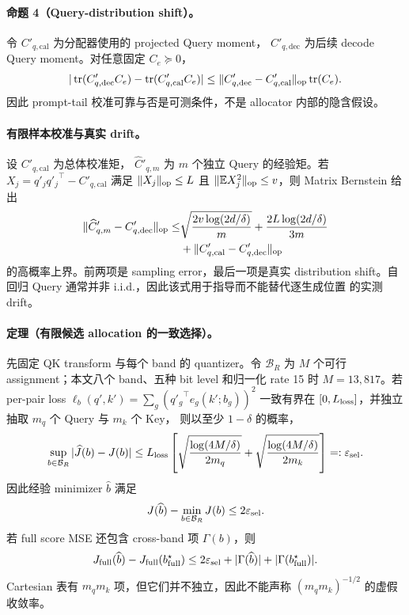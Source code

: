 \paragraph{命题 4（Query-distribution shift）。}
令 $C'_{q,\mathrm{cal}}$ 为分配器使用的 projected Query moment，
$C'_{q,\mathrm{dec}}$ 为后续 decode Query moment。对任意固定
$C_e\succeq0$，
\begin{equation}
 |\operatorname{tr}(C'_{q,\mathrm{dec}}C_e)
 -\operatorname{tr}(C'_{q,\mathrm{cal}}C_e)|
 \le
 \|C'_{q,\mathrm{dec}}-C'_{q,\mathrm{cal}}\|_{\mathrm{op}}\operatorname{tr}(C_e).
 \label{eq:query-drift-bound}
\end{equation}
因此 prompt-tail 校准可靠与否是可测条件，不是 allocator 内部的隐含假设。

\paragraph{有限样本校准与真实 drift。}
设 $C'_{q,\mathrm{cal}}$ 为总体校准矩，
$\widehat C'_{q,m}$ 为 $m$ 个独立 Query 的经验矩。若
$X_j=q'_j{q'_j}^\top-C'_{q,\mathrm{cal}}$ 满足
$\|X_j\|_{\mathrm{op}}\le L$ 且
$\|\mathbb EX_j^2\|_{\mathrm{op}}\le v$，则 Matrix Bernstein 给出
\begin{align}
 \|\widehat C'_{q,m}-C'_{q,\mathrm{dec}}\|_{\mathrm{op}}
 \le&
 \sqrt{\frac{2v\log(2d/\delta)}{m}}
 +\frac{2L\log(2d/\delta)}{3m}\nonumber\\
 &+\|C'_{q,\mathrm{cal}}-C'_{q,\mathrm{dec}}\|_{\mathrm{op}}
 \label{eq:finite-query-bound}
\end{align}
的高概率上界。前两项是 sampling error，最后一项是真实 distribution
shift。自回归 Query 通常并非 i.i.d.，因此该式用于指导而不能替代逐生成位置
的实测 drift。

\paragraph{定理（有限候选 allocation 的一致选择）。}
先固定 QK transform 与每个 band 的 quantizer。令 $\mathcal B_R$ 为
$M$ 个可行 assignment；本文八个 band、五种 bit level 和归一化 rate 15
时 $M=13{,}817$。若 per-pair loss
$\ell_b(q',k')=\sum_g({q'_g}^\top e_g(k';b_g))^2$
一致有界在 $[0,L_{\rm loss}]$，并独立抽取 $m_q$ 个 Query 与 $m_k$ 个 Key，
则以至少 $1-\delta$ 的概率，
\begin{equation}
 \sup_{b\in\mathcal B_R}|\widehat J(b)-J(b)|
 \le L_{\rm loss}\left[
 \sqrt{\frac{\log(4M/\delta)}{2m_q}}+
 \sqrt{\frac{\log(4M/\delta)}{2m_k}}
 \right]
 =:\varepsilon_{\rm sel}.
 \label{eq:allocation-uniform-bound}
\end{equation}
因此经验 minimizer $\widehat b$ 满足
\begin{equation}
 J(\widehat b)-\min_{b\in\mathcal B_R}J(b)
 \le2\varepsilon_{\rm sel}.
 \label{eq:allocation-selection-regret}
\end{equation}
若 full score MSE 还包含 cross-band 项 $\Gamma(b)$，则
\begin{equation}
 J_{\rm full}(\widehat b)-J_{\rm full}(b_{\rm full}^\star)
 \le2\varepsilon_{\rm sel}
 +|\Gamma(\widehat b)|+|\Gamma(b_{\rm full}^\star)|.
 \label{eq:allocation-full-regret}
\end{equation}
Cartesian 表有 $m_qm_k$ 项，但它们并不独立，因此不能声称
$(m_qm_k)^{-1/2}$ 的虚假收敛率。

